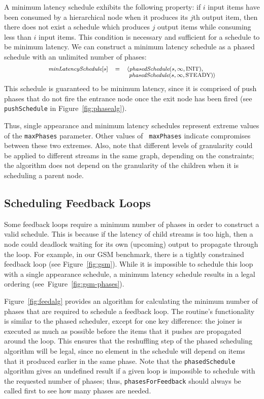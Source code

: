 \documentclass{sig-alt-full}
\begin{document}
A minimum latency schedule exhibits the following property: if $i$
input items have been consumed by a hierarchical node when it produces
its $j$th output item, then there does not exist a schedule which
produces $j$ output items while consuming less than $i$ input items.
This condition is necessary and sufficient for a schedule to be
minimum latency.  We can construct a minimum latency schedule as a
phased schedule with an unlimited number of phases:
\[
\small
\begin{array}{rcl}
\mt{minLatencySchedule}[s] & = & \langle \mt{phasedSchedule}(s, \infty, \mbox{INIT}), \\
                         ~ & ~ & ~ \mt{phasedSchedule}(s, \infty, \mbox{STEADY}) \rangle
\end{array}
\]
This schedule is guaranteed to be minimum latency, since it is
comprised of push phases that do not fire the entrance node once the
exit node has been fired (see {\tt pushSchedule} in
Figure~\ref{fig:phasealg}).

Thus, single appearance and minimum latency schedules represent
extreme values of the {\tt maxPhases} parameter.  Other values of {\tt
maxPhases} indicate compromises between these two extremes.  Also,
note that different levels of granularity could be applied to
different streams in the same graph, depending on the constraints; the
algorithm does not depend on the granularity of the children when it
is scheduling a parent node.

\subsection{Scheduling Feedback Loops}

Some feedback loops require a minimum number of phases in order to
construct a valid schedule.  This is because if the latency of child
streams is too high, then a node could deadlock waiting for its own
(upcoming) output to propagate through the loop.  For example, in our
GSM benchmark, there is a tightly constrained feedback loop (see
Figure~\ref{fig:gsm}).  While it is impossible to schedule this loop
with a single appearance schedule, a minimum latency schedule results
in a legal ordering (see~Figure~\ref{fig:gsm-phases}).

Figure~\ref{fig:feedalg} provides an algorithm for calculating the
minimum number of phases that are required to schedule a feedback
loop.  The routine's functionality is similar to the phased scheduler,
except for one key difference: the joiner is executed as much as
possible before the items that it pushes are propagated around the
loop.  This ensures that the reshuffling step of the phased scheduling
algorithm will be legal, since no element in the schedule will depend
on items that it produced earlier in the same phase.  Note that the
{\tt phasedSchedule} algorithm gives an undefined result if a given
loop is impossible to schedule with the requested number of phases;
thus, {\tt phasesForFeedback} should always be called first to see how
many phases are needed.
\end{document}
